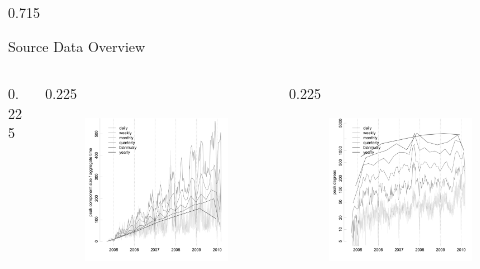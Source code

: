 \documentclass[final]{beamer} %
\newcommand{\spaceProp}{0.02}
\newcommand{\spacer}{\begin{column}{\spaceProp\paperwidth}\end{column}}
\newenvironment{oneCol}{\begin{column}[t]{0.225\paperwidth}}{\end{column}}
\newenvironment{threeCol}{\begin{column}[t]{0.715\paperwidth}}{\end{column}}
\begin{document}
\begin{frame}{}
\begin{columns}[t]
\begin{threeCol}
\begin{block}{Source Data Overview}
\begin{columns}
\begin{oneCol}
\begin{figure}
      \end{figure}   
    \end{oneCol}
    \begin{oneCol}
      \begin{figure}
        \includegraphics[width=1.0\linewidth]{maxComp.png}
      \end{figure}   
    \end{oneCol}
    \begin{oneCol}
      \begin{figure}
        \includegraphics[width=1.0\linewidth]{maxEdges.png}

\end{figure}
\end{oneCol}
\end{columns}
\end{block}
\end{threeCol}
\end{columns}
\end{frame}
\end{document}
